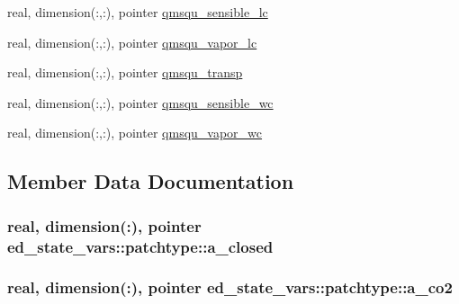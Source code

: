 \begin{DoxyCompactItemize}
\item 
real, dimension(\+:,\+:), pointer \hyperlink{structed__state__vars_1_1patchtype_ae437e540bcc7ff9386dbe5b38fe10dd9}{qmsqu\+\_\+sensible\+\_\+lc}
\item 
real, dimension(\+:,\+:), pointer \hyperlink{structed__state__vars_1_1patchtype_af2c49079a21f3b80c97da1c5bd3f5f33}{qmsqu\+\_\+vapor\+\_\+lc}
\item 
real, dimension(\+:,\+:), pointer \hyperlink{structed__state__vars_1_1patchtype_a13256d3fcdf211a8d6e96f2f66c85a3d}{qmsqu\+\_\+transp}
\item 
real, dimension(\+:,\+:), pointer \hyperlink{structed__state__vars_1_1patchtype_ae819467c850bb972f565f8824a486e40}{qmsqu\+\_\+sensible\+\_\+wc}
\item 
real, dimension(\+:,\+:), pointer \hyperlink{structed__state__vars_1_1patchtype_ab4ce3d9a0fd4287e215c49848059b111}{qmsqu\+\_\+vapor\+\_\+wc}
\end{DoxyCompactItemize}


\subsection{Member Data Documentation}
\subsubsection[{\texorpdfstring{a\+\_\+closed}{a_closed}}]{\setlength{\rightskip}{0pt plus 5cm}real, dimension(\+:), pointer ed\+\_\+state\+\_\+vars\+::patchtype\+::a\+\_\+closed}\hypertarget{structed__state__vars_1_1patchtype_a285ae1ef0231913023b00bca3f89f901}{}\label{structed__state__vars_1_1patchtype_a285ae1ef0231913023b00bca3f89f901}
\subsubsection[{\texorpdfstring{a\+\_\+co2}{a_co2}}]{\setlength{\rightskip}{0pt plus 5cm}real, dimension(\+:), pointer ed\+\_\+state\+\_\+vars\+::patchtype\+::a\+\_\+co2}\hypertarget{structed__state__vars_1_1patchtype_a898793715bc6af7d57e87fce60a2a476}{}\label{structed__state__vars_1_1patchtype_a898793715bc6af7d57e87fce60a2a476}
